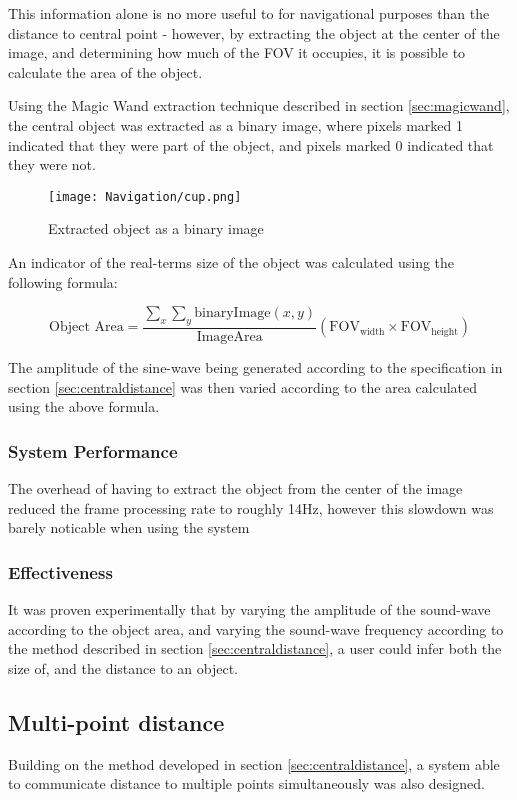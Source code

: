 This information alone is no more useful to for navigational purposes than the distance to central point - however, by extracting the object at the center of the image, and determining how much of the \ac{FOV} it occupies, it is possible to calculate the area of the object.

Using the Magic Wand extraction technique described in section \ref{sec:magicwand}, the central object was extracted as a binary image, where pixels marked 1 indicated that they were part of the object, and pixels marked 0 indicated that they were not. 
\begin{figure}[H]
    \centering
    \texttt{[image: Navigation/cup.png]}
    \caption{Extracted object as a binary image}
\end{figure}

An indicator of the real-terms size of the object was calculated using the following formula:

\begin{equation}
    \mbox{Object Area} = \frac{\sum\limits_x\sum\limits_y \mbox{binaryImage}({x}, {y})}{\mbox{ImageArea}} ({\mbox{FOV}}_{\mbox{width}} \times {\mbox{FOV}}_{\mbox{height}})
\end{equation}

The amplitude of the sine-wave being generated according to the specification in section \ref{sec:centraldistance} was then varied according to the area calculated using the above formula.

\subsubsection{System Performance}

The overhead of having to extract the object from the center of the image reduced the frame processing rate to roughly 14Hz, however this slowdown was barely noticable when using the system

\subsubsection{Effectiveness}
It was proven experimentally that by varying the amplitude of the sound-wave according to the object area, and varying the sound-wave frequency according to the method described in section \ref{sec:centraldistance}, a user could infer both the size of, and the distance to an object. 


\subsection{Multi-point distance}
Building on the method developed in section \ref{sec:centraldistance}, a system able to communicate distance to multiple points simultaneously was also designed.

